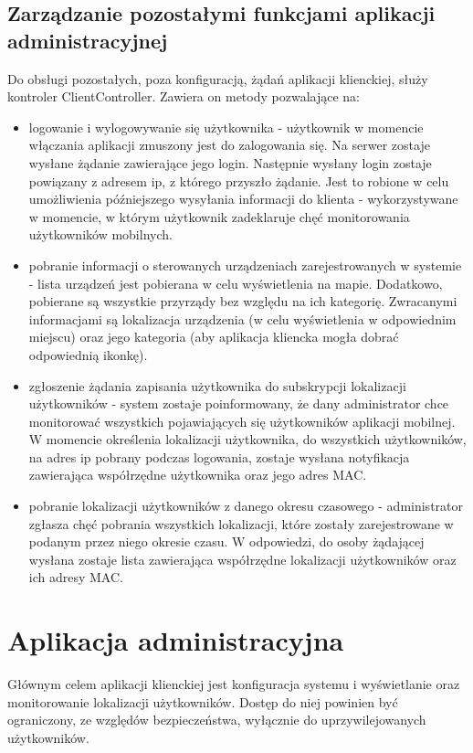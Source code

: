 \subsection{Zarządzanie pozostałymi funkcjami aplikacji administracyjnej}
Do obsługi pozostałych, poza konfiguracją, żądań aplikacji klienckiej, służy kontroler ClientController. Zawiera on metody pozwalające na:
\begin{itemize}
	\item logowanie i wylogowywanie się użytkownika - użytkownik w momencie włączania aplikacji zmuszony jest do zalogowania się. Na serwer zostaje wysłane żądanie zawierające jego login. Następnie wysłany login zostaje powiązany z adresem ip, z którego przyszło żądanie. Jest to robione w celu umożliwienia późniejszego wysyłania informacji do klienta - wykorzystywane w momencie, w którym użytkownik zadeklaruje chęć monitorowania użytkowników mobilnych.
	\item pobranie informacji o sterowanych urządzeniach zarejestrowanych w systemie - lista urządzeń jest pobierana w celu wyświetlenia na mapie. Dodatkowo, pobierane są wszystkie przyrządy bez względu na ich kategorię. Zwracanymi informacjami są lokalizacja urządzenia (w celu wyświetlenia w odpowiednim miejscu) oraz jego kategoria (aby aplikacja kliencka mogła dobrać odpowiednią ikonkę).
	\item zgłoszenie żądania zapisania użytkownika do subskrypcji lokalizacji użytkowników - system zostaje poinformowany, że dany administrator chce monitorować wszystkich pojawiających się użytkowników aplikacji mobilnej. W momencie określenia lokalizacji użytkownika, do wszystkich użytkowników, na adres ip pobrany podczas logowania, zostaje wysłana notyfikacja zawierająca współrzędne użytkownika oraz jego adres MAC.
	\item pobranie lokalizacji użytkowników z danego okresu czasowego - administrator zgłasza chęć pobrania wszystkich lokalizacji, które zostały zarejestrowane w podanym przez niego okresie czasu. W odpowiedzi, do osoby żądającej wysłana zostaje lista zawierająca współrzędne lokalizacji użytkowników oraz ich adresy MAC.
\end{itemize}	
\section{Aplikacja administracyjna}
Głównym celem aplikacji klienckiej jest konfiguracja systemu i wyświetlanie oraz monitorowanie lokalizacji użytkowników. Dostęp do niej powinien być ograniczony, ze względów bezpieczeństwa, wyłącznie do uprzywilejowanych użytkowników.
